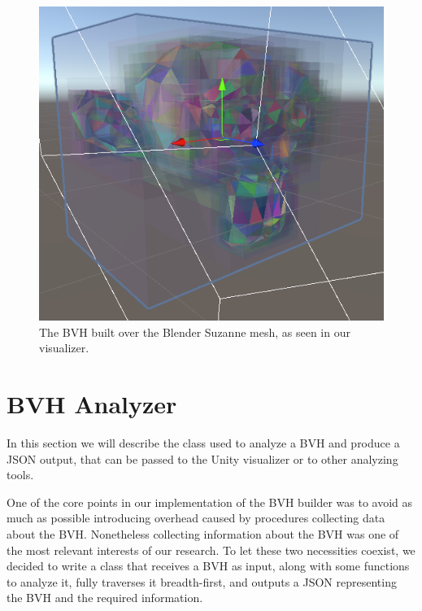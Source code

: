 \documentclass{PoliMi_MasterThesis}
\begin{document}
\begin{figure}[H]
    \centering
    \includegraphics[width=\textwidth]{Images/suzanne_visualizer.png}
    \caption{The BVH built over the Blender Suzanne mesh, as seen in our visualizer.}
    \label{fig:suzanne_visualizer}
\end{figure}

\section{BVH Analyzer} \label{sec:bvh_analyzer}
In this section we will describe the class used to analyze a BVH and produce a JSON output, that can be passed to the Unity visualizer or to other analyzing tools.

One of the core points in our implementation of the BVH builder was to avoid as much as possible introducing overhead caused by procedures collecting data about the BVH. Nonetheless collecting information about the BVH was one of the most relevant interests of our research. To let these two necessities coexist, we decided to write a class that receives a BVH as input, along with some functions to analyze it, fully traverses it breadth-first, and outputs a JSON representing the BVH and the required information.
\end{document}
